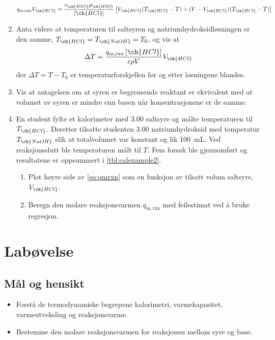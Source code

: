 \begin{enumerate}[label=\alph*)]
		\begin{equation}
			q_\mathrm{m, rxn}V_{\ch{HCl}} = \frac{c_{\ch{H2O}}\rho_{\ch{H2O}}}{\left[\ch{HCl}\right]}\left[V_{\ch{HCl}}(T_{\ch{HCl}}-T)+(V-V_{\ch{HCl}})(T_{\ch{HCl}}-T)\right] \label{eq:qmrxn}
		\end{equation}
		\item Anta videre at temperaturen til saltsyren og natriumhydroksidløsningen er den samme, $T_{\ch{HCl}}=T_{\ch{NaOH}}=T_0$, og vis at
		\begin{equation*}
			\Delta T = \frac{q_\mathrm{m, rxn}\left[\ch{HCl}\right]}{c\rho V}V_{\ch{HCl}}
		\end{equation*}
		der $\Delta T=T - T_0$ er temperaturforskjellen før og etter løsningene blandes.
		
		\item Vis at antagelsen om at syren er begrensende reaktant er ekvivalent med at volumet av syren er mindre enn basen når konsentrasjonene er de samme.
		
		\item En student fylte et kalorimeter med \SI{3.00}{\molar} saltsyre og målte temperaturen til $T_{\ch{HCl}}$.
		Deretter tilsatte studenten \SI{3.00}{\molar} natriumhydroksid med temperatur $T_{\ch{NaOH}}$ slik at totalvolumet var konstant og lik \SI{100}{\milli\liter}.
		Ved reaksjonsslutt ble temperaturen målt til $T$.
		Fem forsøk ble gjennomført og resultatene er oppsummert i \cref{tbl:calexample2}.
		\begin{enumerate}[label=\roman*)]
			\item Plot høyre side av \cref{eq:qmrxn} som en funksjon av tilsatt volum saltsyre, $V_{\ch{HCl}}$.
			\item Beregn den molare reaksjonsvarmen $q_\mathrm{m, rxn}$ med feilestimat ved å bruke regresjon.
		\end{enumerate}	
	\end{enumerate}
	
	\clearpage
	\section{Labøvelse}
	
	\subsection{Mål og hensikt}
	\begin{itemize}
		\item Forstå de termodynamiske begrepene kalorimetri, varmekapasitet, varmeutveksling og reaksjonsvarme.
		
		\item Bestemme den molare reaksjonsvarmen for reaksjonen mellom syre og base.
	\end{itemize}

